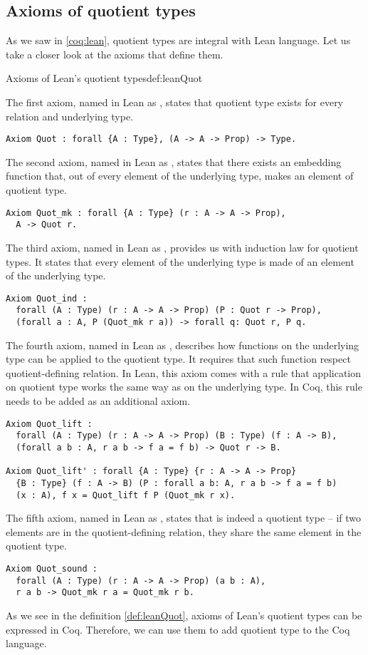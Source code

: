 \subsection{Axioms of quotient types}
As we saw in \ref{coq:lean}, quotient types are integral with Lean language. Let us take a closer look at the axioms that define them.
\begin{defi}{Axioms of Lean's quotient types}{def:leanQuot}

The first axiom, named in Lean as , states that quotient type exists for every relation and underlying type.
\begin{verbatim}
Axiom Quot : forall {A : Type}, (A -> A -> Prop) -> Type.
\end{verbatim}
The second axiom, named in Lean as , states that there exists an embedding function that, out of every element of the underlying type, makes an element of quotient type.
\begin{verbatim}
Axiom Quot_mk : forall {A : Type} (r : A -> A -> Prop), 
  A -> Quot r.
\end{verbatim}
The third axiom, named in Lean as , provides us with induction law for quotient types. It states that every element of the underlying type is made of an element of the underlying type.
\begin{verbatim}
Axiom Quot_ind : 
  forall (A : Type) (r : A -> A -> Prop) (P : Quot r -> Prop),
  (forall a : A, P (Quot_mk r a)) -> forall q: Quot r, P q.
\end{verbatim}
The fourth axiom, named in Lean as , describes how functions on the underlying type can be applied to the quotient type. It requires that such function respect quotient-defining relation. In Lean, this axiom comes with a rule that application on quotient type works the same way as on the underlying type. In Coq, this rule needs to be added as an additional axiom.
\begin{verbatim}
Axiom Quot_lift :
  forall (A : Type) (r : A -> A -> Prop) (B : Type) (f : A -> B),
  (forall a b : A, r a b -> f a = f b) -> Quot r -> B.

Axiom Quot_lift' : forall {A : Type} {r : A -> A -> Prop} 
  {B : Type} (f : A -> B) (P : forall a b: A, r a b -> f a = f b) 
  (x : A), f x = Quot_lift f P (Quot_mk r x).
\end{verbatim}
The fifth axiom, named in Lean as , states that  is indeed a quotient type -- if two elements are in the quotient-defining relation, they share the same element in the quotient type.
\begin{verbatim}
Axiom Quot_sound :
  forall (A : Type) (r : A -> A -> Prop) (a b : A),
  r a b -> Quot_mk r a = Quot_mk r b.
\end{verbatim}
\end{defi}
As we see in the definition \ref{def:leanQuot}, axioms of Lean's quotient types can be expressed in Coq. Therefore, we can use them to add quotient type to the Coq language.
